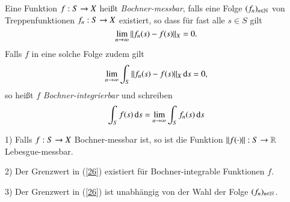 \begin{defi}\label{4.22}
    Eine Funktion $f:S\rightarrow X$ heißt \textit{Bochner-messbar}, falls eine Folge $(f_n)_{n\in\mathbb{N}}$
    von Treppenfunktionen $f_n:S\rightarrow X$ existiert, so dass für fast alle $s\in S$ gilt
    \[
        \lim_{n\rightarrow \infty} \|f_n(s)-f(s)\| _X=0.
    \]
    Falls $f$ in eine solche Folge zudem gilt
    \[
        \lim_{n\rightarrow \infty} \int_S\|f_n(s)-f(s)\|_X \, \mathrm{d} s =0,
    \]
    so heißt $f$ \textit{Bochner-integrierbar} und schreiben
    \begin{align}\label{26}
        \int_S f(s)\, \mathrm{d} s=\lim_{n\rightarrow\infty} \int_S f_n(s)\, \mathrm{d} s
    \end{align}
\end{defi}

\begin{prop}\label{4.23}
    \begin{description}
    \item{1)}
    Falls $f:S\rightarrow X$ Bochner-messbar ist, so ist die Funktion $\|f(\cdot)\|:S\rightarrow \mathbb{R}$ Lebesgue-messbar.
    \item{2)}
    Der Grenzwert in (\ref{26}) existiert für Bochner-integrable Funktionen $f$.
    \item{3)}
    Der Grenzwert in (\ref{26}) ist unabhängig von der Wahl der Folge $(f_n)_{n\in\mathbb{N}}$. 
    \end{description}
\end{prop}

